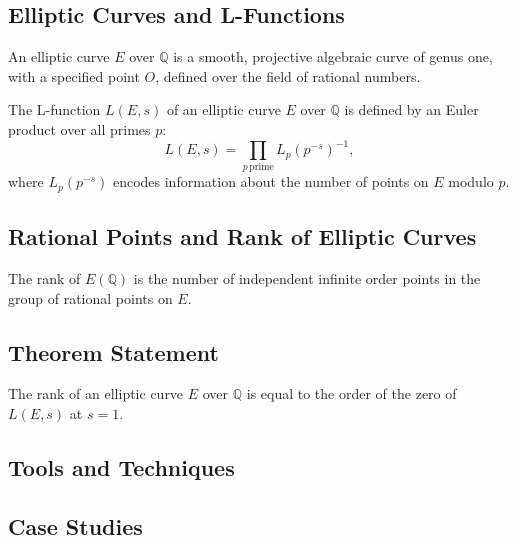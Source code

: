 \documentclass[12pt, a4paper]{article}
\theoremstyle{definitionstyle}
\begin{document}
\subsection{Elliptic Curves and L-Functions}
\begin{definition}
An elliptic curve $E$ over $\mathbb{Q}$ is a smooth, projective algebraic curve of genus one, with a specified point $O$, defined over the field of rational numbers.
\end{definition}

\begin{definition}[L-function]
The L-function $L(E,s)$ of an elliptic curve $E$ over $\mathbb{Q}$ is defined by an Euler product over all primes $p$:
\begin{equation}
L(E,s) = \prod_{p\,\text{prime}} L_p(p^{-s})^{-1},
\end{equation}
where $L_p(p^{-s})$ encodes information about the number of points on $E$ modulo $p$.
\end{definition}

\subsection{Rational Points and Rank of Elliptic Curves}
\begin{definition}
The rank of $E(\mathbb{Q})$ is the number of independent infinite order points in the group of rational points on $E$.
\end{definition}

\subsection{Theorem Statement}
\begin{theorem}
\label{thm:bsd}
The rank of an elliptic curve $E$ over $\mathbb{Q}$ is equal to the order of the zero of $L(E,s)$ at $s=1$.
\end{theorem}

\subsection{Tools and Techniques}

\subsection{Case Studies}
\end{document}
